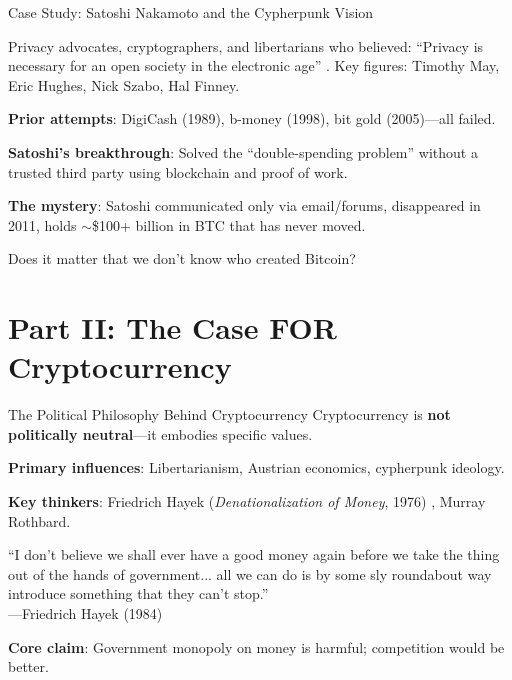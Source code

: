 ﻿\documentclass[aspectratio=169,11pt]{beamer}
\begin{document}
\begin{frame}{Case Study: Satoshi Nakamoto and the Cypherpunk Vision}
\begin{casestudybox}
Privacy advocates, cryptographers, and libertarians who believed: ``Privacy is necessary for an open society in the electronic age'' \parencite{hughes_cypherpunk}. Key figures: Timothy May, Eric Hughes, Nick Szabo, Hal Finney.
\end{casestudybox}

\vspace{0.3em}
\textbf{Prior attempts}: DigiCash (1989), b-money (1998), bit gold (2005)---all failed.

\textbf{Satoshi's breakthrough}: Solved the ``double-spending problem'' without a trusted third party using blockchain and proof of work.

\textbf{The mystery}: Satoshi communicated only via email/forums, disappeared in 2011, holds $\sim$\$100+ billion in BTC that has never moved.

\begin{discussionbox}[Discussion]
Does it matter that we don't know who created Bitcoin?
\end{discussionbox}
\end{frame}

\section{Part II: The Case FOR Cryptocurrency}

\begin{frame}{The Political Philosophy Behind Cryptocurrency}
Cryptocurrency is \textbf{not politically neutral}---it embodies specific values.

\vspace{0.3em}
\textbf{Primary influences}: Libertarianism, Austrian economics, cypherpunk ideology.

\textbf{Key thinkers}: Friedrich Hayek (\emph{Denationalization of Money}, 1976) \parencite{hayek_denationalization}, Murray Rothbard.

\begin{quotebox}
``I don't believe we shall ever have a good money again before we take the thing out of the hands of government... all we can do is by some sly roundabout way introduce something that they can't stop.''\\
\hfill---Friedrich Hayek (1984)
\end{quotebox}

\textbf{Core claim}: Government monopoly on money is harmful; competition would be better.
\end{frame}
\end{document}
